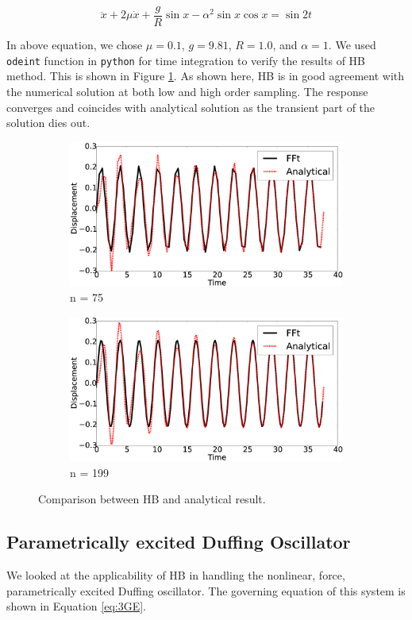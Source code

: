 \documentclass[12pt, a4paper]{extarticle}
\begin{document}
\begin{equation}\label{eq:2GE}
	\ddot{x} + 2 \mu \dot{x} + \frac{g}{R} \sin x - \alpha^2 \sin x \cos x = \sin 2t
\end{equation}

In above equation, we chose $\mu = 0.1$, $g = 9.81$, $R = 1.0$, and $\alpha = 1$. We used \texttt{odeint} function in \texttt{python} for time integration to verify the results of HB method. This is shown in Figure \ref{fig:R2}. As shown here, HB is in good agreement with the numerical solution at both low and high order sampling. The response converges and coincides with analytical solution as the transient part of the solution dies out.

\begin{figure}[H]
	\centering
	\begin{subfigure}[h]{8.0 cm}
		\includegraphics[width=8.0 cm]{figure/2N75.eps}
		\caption{n = 75}
	\end{subfigure}
	\begin{subfigure}[h]{8.0 cm}
        \includegraphics[width=8.0 cm]{figure/2N199.eps}
		\caption{n = 199}
    \end{subfigure}
    \caption{Comparison between HB and analytical result.}
    \label{fig:R2}
\end{figure}

\subsection{Parametrically excited Duffing Oscillator}
We looked at the applicability of HB in handling the nonlinear, force, parametrically excited Duffing oscillator. The governing equation of this system is shown in Equation \eqref{eq:3GE}.
\end{document}
